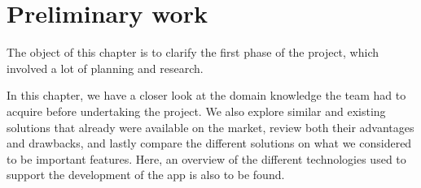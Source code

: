 \chapter{Preliminary work}

\label{sec:prestudy}
The object of this chapter is to clarify the first phase of the project, which involved a lot of planning and research. 

In this chapter, we have a closer look at the domain knowledge the team had to acquire before undertaking the project. We also explore similar and existing solutions that already were available on the market, review both their advantages and drawbacks, and lastly compare the different solutions on what we considered to be important features. Here, an overview of the different technologies used to support the development of the app is also to be found.


\newpage





